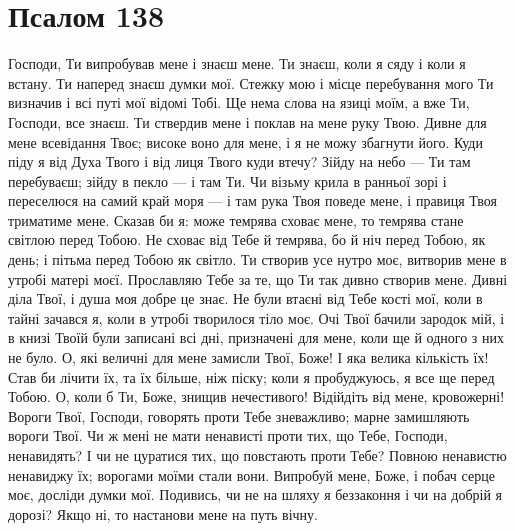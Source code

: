 \documentclass[chapters.tex]{subfiles}
\begin{document}
\section{Псалом 138}
Господи, Ти випробував мене і знаєш мене. Ти знаєш, коли я сяду і коли я встану. Ти наперед знаєш думки мої. Стежку мою і місце перебування мого Ти визначив і всі путі мої відомі Тобі. Ще нема слова на язиці моїм, а вже Ти, Господи, все знаєш. Ти ствердив мене і поклав на мене руку Твою. Дивне для мене всевідання Твоє; високе воно для мене, і я не можу збагнути його. Куди піду я від Духа Твого і від лиця Твого куди втечу? Зійду на небо — Ти там перебуваєш; зійду в пекло — і там Ти. Чи візьму крила в ранньої зорі і переселюся на самий край моря — і там рука Твоя поведе мене, і правиця Твоя триматиме мене. Сказав би я: може темрява сховає мене, то темрява стане світлою перед Тобою. Не сховає від Тебе й темрява, бо й ніч перед Тобою, як день; і пітьма перед Тобою як світло. Ти створив усе нутро моє, витворив мене в утробі матері моєї. Прославляю Тебе за те, що Ти так дивно створив мене. Дивні діла Твої, і душа моя добре це знає. Не були втаєні від Тебе кості мої, коли в тайні зачався я, коли в утробі творилося тіло моє. Очі Твої бачили зародок мій, і в книзі Твоїй були записані всі дні, призначені для мене, коли ще й одного з них не було. О, які величні для мене замисли Твої, Боже! І яка велика кількість їх! Став би лічити їх, та їх більше, ніж піску; коли я пробуджуюсь, я все ще перед Тобою. О, коли б Ти, Боже, знищив нечестивого! Відійдіть від мене, кровожерні! Вороги Твої, Господи, говорять проти Тебе зневажливо; марне замишляють вороги Твої. Чи ж мені не мати ненависті проти тих, що Тебе, Господи, ненавидять? І чи не цуратися тих, що повстають проти Тебе? Повною ненавистю ненавиджу їх; ворогами моїми стали вони. Випробуй мене, Боже, і побач серце моє, досліди думки мої. Подивись, чи не на шляху я беззаконня і чи на добрій я дорозі? Якщо ні, то настанови мене на путь вічну.
\end{document}
